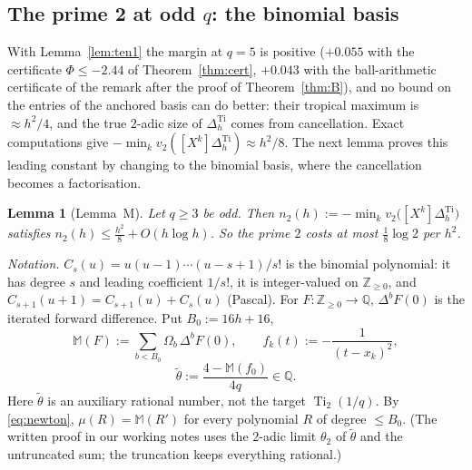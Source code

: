 \documentclass[11pt]{amsart}
\newtheorem{lemma}[theorem]{Lemma}
\theoremstyle{definition}
\theoremstyle{remark}
\numberwithin{equation}{section}
\newcommand{\ZZ}{\mathbb{Z}}
\newcommand{\QQ}{\mathbb{Q}}
\newcommand{\Ti}{\operatorname{Ti}}
\begin{document}
\subsection{The prime 2 at odd \texorpdfstring{$q$}{q}: the binomial basis}
With Lemma~\ref{lem:ten1} the margin at $q=5$ is positive ($+0.055$ with the certificate $\Phi\le-2.44$ of
Theorem~\ref{thm:cert}, $+0.043$ with the ball-arithmetic certificate of the remark after the proof of
Theorem~\ref{thm:B}), and no bound on the entries of the anchored basis can do better: their tropical maximum is
$\approx h^2/4$, and the true $2$-adic size of $\Delta^{\Ti}_h$ comes from cancellation. Exact computations give
$-\min_kv_2([X^k]\Delta^{\Ti}_h)\approx h^2/8$. The next lemma proves this leading constant by changing to the binomial
basis, where the cancellation becomes a factorisation.

\begin{lemma}[Lemma~M]\label{lem:M}
Let $q\ge3$ be odd. Then $n_2(h):=-\min_kv_2\bigl([X^k]\Delta^{\Ti}_h\bigr)$ satisfies
$n_2(h)\le\frac{h^2}8+O(h\log h)$. So the prime $2$ costs at most $\frac18\log2$ per $h^2$.
\end{lemma}

\emph{Notation.} $C_s(u)=u(u-1)\cdots(u-s+1)/s!$ is the binomial polynomial: it has degree $s$ and leading coefficient
$1/s!$, it is integer-valued on $\ZZ_{\ge0}$, and $C_{s+1}(u+1)=C_{s+1}(u)+C_s(u)$ (Pascal). For $F\colon\ZZ_{\ge0}\to\QQ$,
$\Delta^bF(0)$ is the iterated forward difference. Put $B_0:=16h+16$,
\[
  \mathbb M(F):=\sum_{b<B_0}\Omega_b\,\Delta^bF(0),\qquad f_k(t):=-\frac1{(t-x_k)^2},
\]
\[
  \tilde\theta:=\frac{4-\mathbb M(f_0)}{4q}\in\QQ .
\]
Here $\tilde\theta$ is an auxiliary rational number, not the target $\Ti_2(1/q)$. By \eqref{eq:newton},
$\mu(R)=\mathbb M(R')$ for every polynomial $R$ of degree $\le B_0$. (The written proof in our working notes uses the
$2$-adic limit $\theta_2$ of $\tilde\theta$ and the untruncated sum; the truncation keeps everything rational.)
\end{document}
